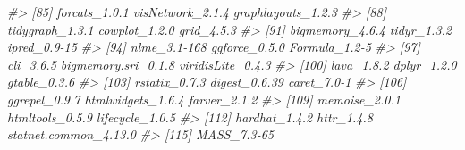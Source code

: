 \documentclass[
]{article}
\newenvironment{Shaded}{\begin{snugshade}}{\end{snugshade}}
\newcommand{\CommentTok}[1]{\textcolor[rgb]{0.56,0.35,0.01}{\textit{#1}}}
\begin{document}
\begin{Shaded}
\begin{Highlighting}[]
\CommentTok{\#\textgreater{}  [85] forcats\_1.0.1         visNetwork\_2.1.4      graphlayouts\_1.2.3   }
\CommentTok{\#\textgreater{}  [88] tidygraph\_1.3.1       cowplot\_1.2.0         grid\_4.5.3           }
\CommentTok{\#\textgreater{}  [91] bigmemory\_4.6.4       tidyr\_1.3.2           ipred\_0.9{-}15         }
\CommentTok{\#\textgreater{}  [94] nlme\_3.1{-}168          ggforce\_0.5.0         Formula\_1.2{-}5        }
\CommentTok{\#\textgreater{}  [97] cli\_3.6.5             bigmemory.sri\_0.1.8   viridisLite\_0.4.3    }
\CommentTok{\#\textgreater{} [100] lava\_1.8.2            dplyr\_1.2.0           gtable\_0.3.6         }
\CommentTok{\#\textgreater{} [103] rstatix\_0.7.3         digest\_0.6.39         caret\_7.0{-}1          }
\CommentTok{\#\textgreater{} [106] ggrepel\_0.9.7         htmlwidgets\_1.6.4     farver\_2.1.2         }
\CommentTok{\#\textgreater{} [109] memoise\_2.0.1         htmltools\_0.5.9       lifecycle\_1.0.5      }
\CommentTok{\#\textgreater{} [112] hardhat\_1.4.2         httr\_1.4.8            statnet.common\_4.13.0}
\CommentTok{\#\textgreater{} [115] MASS\_7.3{-}65}
\end{Highlighting}
\end{Shaded}


\renewcommand\refname{References}

\end{document}
